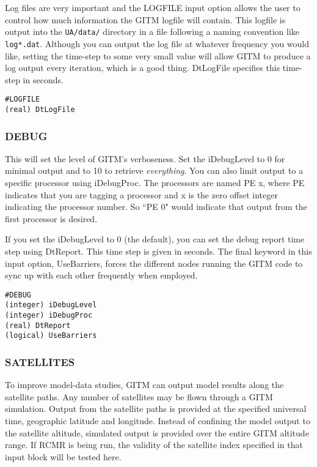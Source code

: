 Log files are very important and the LOGFILE input option allows the user to control how much information the GITM logfile will contain.  This logfile is output into the {\tt UA/data/} directory in a file following a naming convention like {\tt log*.dat}.  Although you can output the log file at whatever frequency you would like, setting the time-step to some very small value will allow GITM to produce a log output every iteration, which is a good thing.  DtLogFile specifies this time-step in seconds.

\begin{verbatim}
#LOGFILE
(real) DtLogFile
\end{verbatim}

\subsubsection{DEBUG}
\label{debug.sec}

This will set the level of GITM's verboseness.  Set the iDebugLevel to 0 for minimal output and to 10 to retrieve \textit{everything}.  You can also limit output to a specific processor using iDebugProc.  The processors are named PE x, where PE indicates that you are tagging a processor and x is the zero offset integer indicating the processor number.  So ``PE 0" would indicate that output from the first processor is desired.

If you set the iDebugLevel to 0 (the default), you can set the debug report time step using DtReport.  This time step is given in seconds.  The final keyword in this input option, UseBarriers, forces the different nodes running the GITM code to sync up with each other frequently when employed.

\begin{verbatim}
#DEBUG
(integer) iDebugLevel
(integer) iDebugProc  
(real) DtReport    
(logical) UseBarriers 
\end{verbatim}

\subsubsection{SATELLITES}
\label{satellites.sec}

To improve model-data studies, GITM can output model results along the satellite paths.  Any number of satellites may be flown through a GITM simulation.  Output from the satellite paths is provided at the specified universal time, geographic latitude and longitude.  Instead of confining the model output to the satellite altitude, simulated output is provided over the entire GITM altitude range.  If RCMR is being run, the validity of the satellite index specified in that input block will be tested here.

